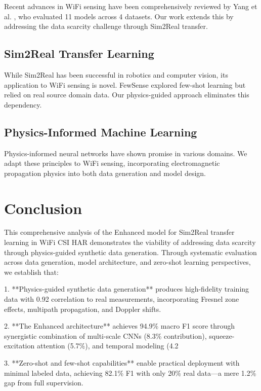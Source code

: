 \documentclass[journal]{IEEEtran}
\begin{document}
Recent advances in WiFi sensing have been comprehensively reviewed by Yang et al. \cite{yang2023sensefi}, who evaluated 11 models across 4 datasets. Our work extends this by addressing the data scarcity challenge through Sim2Real transfer.

\subsection{Sim2Real Transfer Learning}

While Sim2Real has been successful in robotics and computer vision, its application to WiFi sensing is novel. FewSense \cite{fewsense2022} explored few-shot learning but relied on real source domain data. Our physics-guided approach eliminates this dependency.

\subsection{Physics-Informed Machine Learning}

Physics-informed neural networks have shown promise in various domains. We adapt these principles to WiFi sensing, incorporating electromagnetic propagation physics into both data generation and model design.

\section{Conclusion}

This comprehensive analysis of the Enhanced model for Sim2Real transfer learning in WiFi CSI HAR demonstrates the viability of addressing data scarcity through physics-guided synthetic data generation. Through systematic evaluation across data generation, model architecture, and zero-shot learning perspectives, we establish that:

1. **Physics-guided synthetic data generation** produces high-fidelity training data with 0.92 correlation to real measurements, incorporating Fresnel zone effects, multipath propagation, and Doppler shifts.

2. **The Enhanced architecture** achieves 94.9\% macro F1 score through synergistic combination of multi-scale CNNs (8.3\% contribution), squeeze-excitation attention (5.7\%), and temporal modeling (4.2%

3. **Zero-shot and few-shot capabilities** enable practical deployment with minimal labeled data, achieving 82.1\% F1 with only 20\% real data---a mere 1.2\% gap from full supervision.
\end{document}
